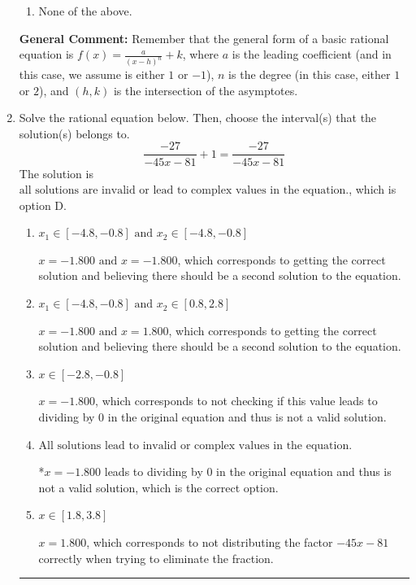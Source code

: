 \documentclass{extbook}[14pt]
\newcommand{\litem}[1]{\item #1

\rule{\textwidth}{0.4pt}}
\begin{document}
\begin{enumerate}
{\begin{enumerate}[label=\Alph*.]
\begin{multicols}{2}
\end{multicols}\item None of the above.\end{enumerate}
\textbf{General Comment:} Remember that the general form of a basic rational equation is $ f(x) = \frac{a}{(x-h)^n} + k$, where $a$ is the leading coefficient (and in this case, we assume is either $1$ or $-1$), $n$ is the degree (in this case, either $1$ or $2$), and $(h, k)$ is the intersection of the asymptotes.
}
\litem{
Solve the rational equation below. Then, choose the interval(s) that the solution(s) belongs to.
\[ \frac{-27}{-45x -81} + 1 = \frac{-27}{-45x -81} \]The solution is \( \text{all solutions are invalid or lead to complex values in the equation.} \), which is option D.\begin{enumerate}[label=\Alph*.]
\item \( x_1 \in [-4.8, -0.8] \text{ and } x_2 \in [-4.8,-0.8] \)

$x = -1.800 \text{ and } x = -1.800$, which corresponds to getting the correct solution and believing there should be a second solution to the equation.
\item \( x_1 \in [-4.8, -0.8] \text{ and } x_2 \in [0.8,2.8] \)

$x = -1.800 \text{ and } x = 1.800$, which corresponds to getting the correct solution and believing there should be a second solution to the equation.
\item \( x \in [-2.8,-0.8] \)

$x = -1.800$, which corresponds to not checking if this value leads to dividing by 0 in the original equation and thus is not a valid solution.
\item \( \text{All solutions lead to invalid or complex values in the equation.} \)

*$x = -1.800$ leads to dividing by 0 in the original equation and thus is not a valid solution, which is the correct option.
\item \( x \in [1.8,3.8] \)

$x = 1.800$, which corresponds to not distributing the factor $-45x -81$ correctly when trying to eliminate the fraction.
\end{enumerate}

}
\end{enumerate}
\end{document}
